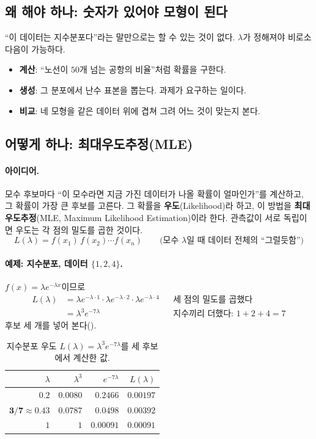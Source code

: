 \documentclass[11pt]{article}
\newcommand{\term}[1]{\textbf{#1}}
\begin{document}
\subsection{왜 해야 하나: 숫자가 있어야 모형이 된다}
``이 데이터는 지수분포다''라는 말만으로는 할 수 있는 것이 없다. $\lambda$가 정해져야
비로소 다음이 가능하다.
\begin{itemize}
  \item \term{계산}: ``노선이 $50$개 넘는 공항의 비율''처럼 확률을 구한다.
  \item \term{생성}: 그 분포에서 난수 표본을 뽑는다. 과제가 요구하는 일이다.
  \item \term{비교}: 네 모형을 같은 데이터 위에 겹쳐 그려 어느 것이 맞는지 본다.
\end{itemize}

\subsection{어떻게 하나: 최대우도추정(MLE)}
\paragraph{아이디어.} 모수 후보마다 ``이 모수라면 지금 가진 데이터가 나올 확률이
얼마인가''를 계산하고, 그 확률이 가장 큰 후보를 고른다. 그 확률을
\term{우도}(Likelihood)라 하고, 이 방법을 \term{최대우도추정}(MLE, Maximum Likelihood
Estimation)이라 한다. 관측값이 서로 독립이면 우도는 각 점의 밀도를 곱한 것이다.
\[
  L(\lambda) = f(x_1)\,f(x_2)\cdots f(x_n)
  \qquad \text{(모수 $\lambda$일 때 데이터 전체의 ``그럴듯함'')}
\]

\paragraph{예제: 지수분포, 데이터 $\{1, 2, 4\}$.}
$f(x) = \lambda e^{-\lambda x}$이므로
\begin{align*}
  L(\lambda) &= \lambda e^{-\lambda \cdot 1} \cdot \lambda e^{-\lambda \cdot 2} \cdot \lambda e^{-\lambda \cdot 4}
    && \text{세 점의 밀도를 곱했다}\\
             &= \lambda^3 e^{-7\lambda}
    && \text{지수끼리 더했다: $1+2+4 = 7$}
\end{align*}
후보 세 개를 넣어 본다().

\begin{table}[H]
  \centering
  \caption{지수분포 우도 $L(\lambda) = \lambda^3 e^{-7\lambda}$를 세 후보에서 계산한 값.}
  \label{tab:likelihood}
  \begin{tabular}{rrrr}
    \toprule
    $\lambda$ & $\lambda^3$ & $e^{-7\lambda}$ & $L(\lambda)$ \\
    \midrule
    $0.2$ & $0.0080$ & $0.2466$ & $0.00197$ \\
    \midrule
    $\mathbf{3/7 \approx 0.43}$ & $0.0787$ & $0.0498$ & $\mathbf{0.00392}$ \\
    \midrule
    $1$ & $1$ & $0.00091$ & $0.00091$ \\
    \bottomrule
  \end{tabular}
\end{table}
\end{document}
